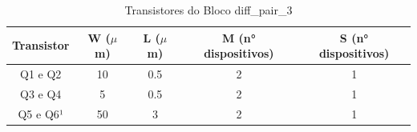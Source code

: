 \begin{table}[htbp]
\caption{Transistores do Bloco diff\_pair\_3}
\label{pard_diff3}
\centering
\begin{tabular}{ccccc}
\toprule
Transistor & W ($\mu$m)  & L ($\mu$m)           & M (n° dispositivos) & S (n° dispositivos)\\
\midrule \midrule
Q1 e Q2 & 10 & 0.5 & 2 & 1\\
\midrule
Q3 e Q4 & 5 & 0.5 & 2 & 1\\
\midrule
Q5 e Q6¹ & 50 & 3 & 2 & 1\\

\bottomrule
\end{tabular}
\end{table}